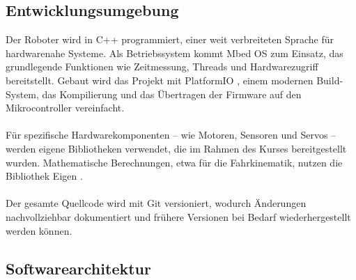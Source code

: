 \documentclass[11pt,a4paper]{article}
\begin{document}
	\subsection{Entwicklungsumgebung}
	Der Roboter wird in C++ programmiert, einer weit verbreiteten Sprache für hardwarenahe Systeme. Als Betriebssystem kommt Mbed OS \cite{mbed-os} zum Einsatz, das grundlegende Funktionen wie Zeitmessung,  
	Threads und Hardwarezugriff bereitstellt. Gebaut wird das Projekt mit PlatformIO \cite{platformio}, einem modernen Build-System, das Kompilierung und das Übertragen der Firmware auf den Mikrocontroller
	vereinfacht.\\ \\
	\noindent
	Für spezifische Hardwarekomponenten – wie Motoren, Sensoren und Servos – werden eigene Bibliotheken verwendet, die im Rahmen des Kurses bereitgestellt wurden. Mathematische Berechnungen,  
	etwa für die Fahrkinematik, nutzen die Bibliothek Eigen \cite{eigen}.\\ \\
	\noindent
	Der gesamte Quellcode wird mit Git \cite{git-scm} versioniert, wodurch Änderungen nachvollziehbar dokumentiert und frühere Versionen bei Bedarf wiederhergestellt werden können.
	
	\subsection{Softwarearchitektur}
\end{document}

